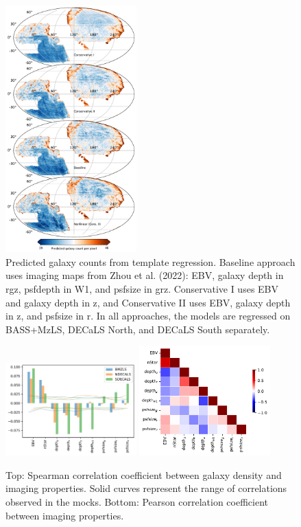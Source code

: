 \begin{figure}
    \centering
    \includegraphics[width=0.45\textwidth]{figures/npred.pdf}
    \caption{Predicted galaxy counts from template regression. Baseline approach uses imaging maps from Zhou et al. (2022): EBV, galaxy depth in rgz, psfdepth in W1, and psfsize in grz. Conservative I uses EBV and galaxy depth in z, and Conservative II uses EBV, galaxy depth in z, and psfsize in r. In all approaches, the models are regressed on BASS+MzLS, DECaLS North, and DECaLS South separately.}
    \label{fig:npred}
\end{figure}




\begin{figure}
    \includegraphics[width=0.45\textwidth]{figures/pcc.pdf} 
    \includegraphics[width=0.45\textwidth]{figures/pccx.pdf}     
    \caption{Top: Spearman correlation coefficient between galaxy density and imaging properties. Solid curves represent the range of correlations observed in the mocks. Bottom: Pearson correlation coefficient between imaging properties.}
    \label{fig:pcc}
\end{figure}



